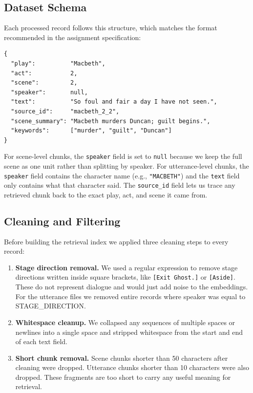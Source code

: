 \documentclass[10pt,conference]{IEEEtran}
\begin{document}
\subsection{Dataset Schema}

Each processed record follows this structure, which matches the format
recommended in the assignment specification:

\begin{lstlisting}
{
  "play":          "Macbeth",
  "act":           2,
  "scene":         2,
  "speaker":       null,
  "text":          "So foul and fair a day I have not seen.",
  "source_id":     "macbeth_2_2",
  "scene_summary": "Macbeth murders Duncan; guilt begins.",
  "keywords":      ["murder", "guilt", "Duncan"]
}
\end{lstlisting}

For scene-level chunks, the \texttt{speaker} field is set to
\texttt{null} because we keep the full scene as one unit rather than
splitting by speaker. For utterance-level chunks, the
\texttt{speaker} field contains the character name (e.g.,
\texttt{"MACBETH"}) and the \texttt{text} field only contains what
that character said. The \texttt{source\_id} field lets us trace any
retrieved chunk back to the exact play, act, and scene it came from.

\subsection{Cleaning and Filtering}

Before building the retrieval index we applied three cleaning steps to
every record:

\begin{enumerate}
    \item \textbf{Stage direction removal.} We used a regular
    expression to remove stage directions written inside square
    brackets, like \texttt{[Exit Ghost.]} or \texttt{[Aside]}.
    These do not represent dialogue and would just add noise to the
    embeddings. For the utterance files we removed entire records
    where speaker was equal to STAGE\_DIRECTION.

    \item \textbf{Whitespace cleanup.} We collapsed any sequences of
    multiple spaces or newlines into a single space and stripped
    whitespace from the start and end of each text field.

    \item \textbf{Short chunk removal.} Scene chunks shorter than 50
    characters after cleaning were dropped. Utterance chunks shorter
    than 10 characters were also dropped. These fragments are too
    short to carry any useful meaning for retrieval.
\end{enumerate}
\end{document}
